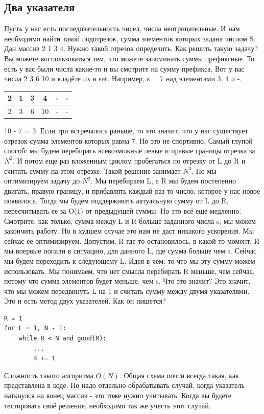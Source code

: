\documentclass[12pt]{article}
\begin{document}
\subsection*{Два указателя}
Пусть у нас есть последовательность чисел, числа неотрицательные. И нам необходимо найти такой подотрезок, сумма элементов которых задана числом S. Дан массив 2 1 3 4. Нужно такой отрезок определить. Как решить такую задачу? Вы можете воспользоваться тем, что можете запоминать суммы префиксные. То есть у вас были числа какие-то и вы смотрите на сумму префикса. Вот у вас числа 2 3 6 10 и кладёте их в set. Например, s = 7 над элементами 3, 4 и -. 
\renewcommand{\arraystretch}{1.5}
\renewcommand{\tabcolsep}{0.2cm}
\begin{center}
\centering
\begin{tabular}{|c|c|c|c|c|c|}
\hline
2 & 1 & 3 & 4 & - & - \\
\hline
2 & 3 & 6 & 10 & - & - \\ 
\hline
\end{tabular}
\end{center}
10 - 7 = 3. Если три встречалось раньше, то это значит, что у нас существует отрезок сумма элементов которых равна 7. Но это не спортивно. Самый глупой способ: мы будем перебирать всевозможные левые и правые границы отрезка за $N^2$. И потом еще раз вложенным циклом пробегаться по отрезку от L до R и считать сумму на этом отрезке. Такой решение занимает $N^3$. Но мы оптимизируем задачу до $N^2$. Мы перебираем L, а R мы будем постепенно двигать, правую границу, и прибавлять каждый раз то число, которое у нас новое появилось. Тогда мы будем поддерживать актуальную сумму от L до R, пересчитывать ее за O(1) от предыдущей суммы. Но это всё еще медленно. Смотрите, как только, сумма между L и R больше заданного числа s, мы можем закончить работу. Но в худшем случае это нам не даст никакого ускорения. Мы сейчас ее оптимизируем. Допустим, R где-то остановилось, в какой-то момент. И мы впервые попали в ситуацию, для данного L, где сумма больше чем s. Сейчас мы будем переходить к следующему L. Идея в чём: то что мы эту сумму можем использовать. Мы понимаем, что нет смысла перебирать R меньше, чем сейчас, потому что сумма элементов будет меньше, чем s. Что это значит? Это значит, что мы можем передвинуть L на 1 и считать сумму между двумя указателями. Это и есть метод двух указателей. Как он пишется?
\begin{verbatim}
R = 1
for L = 1, N - 1:
    while R < N and good(R):
        ...
        R += 1
\end{verbatim}
Сложность такого алгоритма $O(N)$. Общая схема почти всегда такая, как представлена в коде. Но надо отдельно обрабатывать случай, когда указатель наткнулся на конец массив - это тоже нужно учитывать. Когда вы будете тестировать своё решение, необходимо так же учесть этот случай. 
\end{document}
